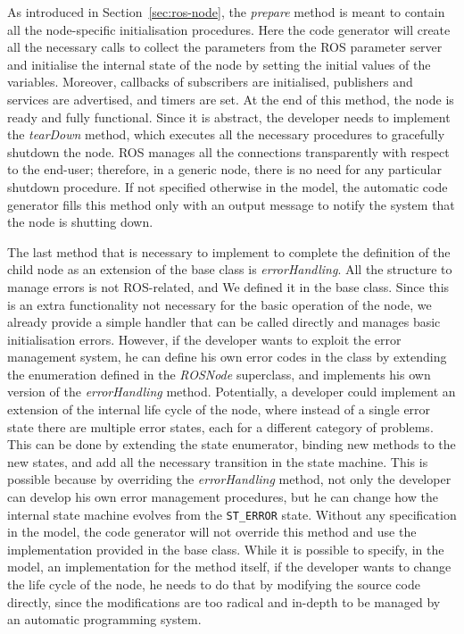As introduced in Section~\ref{sec:ros-node}, the \textit{prepare} method is meant to contain all the node-specific initialisation procedures. Here the code generator will create all the necessary calls to collect the parameters from the ROS parameter server and initialise the internal state of the node by setting the initial values of the variables. Moreover, callbacks of subscribers are initialised, publishers and services are advertised, and timers are set. At the end of this method, the node is ready and fully functional. Since it is abstract, the developer needs to implement the \textit{tearDown} method, which executes all the necessary procedures to gracefully shutdown the node. ROS manages all the connections transparently with respect to the end-user; therefore, in a generic node, there is no need for any particular shutdown procedure. If not specified otherwise in the model, the automatic code generator fills this method only with an output message to notify the system that the node is shutting down.

The last method that is necessary to implement to complete the definition of the child node as an extension of the base class is \textit{errorHandling}. All the structure to manage errors is not ROS-related, and We defined it in the base class. Since this is an extra functionality not necessary for the basic operation of the node, we already provide a simple handler that can be called directly and manages basic initialisation errors. However, if the developer wants to exploit the error management system, he can define his own error codes in the class by extending the enumeration defined in the \textit{ROSNode} superclass, and implements his own version of the \textit{errorHandling} method. Potentially, a developer could implement an extension of the internal life cycle of the node, where instead of a single error state there are multiple error states, each for a different category of problems. This can be done by extending the state enumerator, binding new methods to the new states, and add all the necessary transition in the state machine. This is possible because by overriding the \textit{errorHandling} method, not only the developer can develop his own error management procedures, but he can change how the internal state machine evolves from the \texttt{ST\_ERROR} state. Without any specification in the model, the code generator will not override this method and use the implementation provided in the base class. While it is possible to specify, in the model, an implementation for the method itself, if the developer wants to change the life cycle of the node, he needs to do that by modifying the source code directly, since the modifications are too radical and in-depth to be managed by an automatic programming system.

